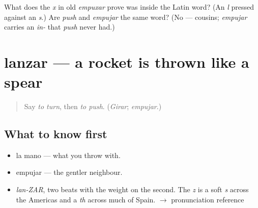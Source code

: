 \begin{tcolorbox}[breakable,colback=teal!4,colframe=teal!35!black,title={Before you move on}]
What does the \emph{x} in old \emph{empuxar} prove was inside the Latin word? (An \emph{l} pressed against an \emph{s}.) Are \emph{push} and \emph{empujar} the same word? (No — cousins; \emph{empujar} carries an \emph{in-} that \emph{push} never had.)
\end{tcolorbox}
\section[lanzar]{lanzar — a rocket is thrown like a spear}

\label{lesson:ES-C388-lanzar}



\begin{quote}
Say \emph{to turn}, then \emph{to push}. (\emph{Girar}; \emph{empujar}.)
\end{quote}

\subsection*{What to know first}
\begin{itemize}
\raggedright
  \item la mano — what you throw with.
  \item empujar — the gentler neighbour.
\end{itemize}

\begin{sounds}
\begin{itemize}
\raggedright
  \item \emph{lan-ZAR}, two beats with the weight on the second. The \emph{z} is a soft \emph{s} across the Americas and a \emph{th} across much of Spain. $\to$ pronunciation reference
\end{itemize}
\end{sounds}

